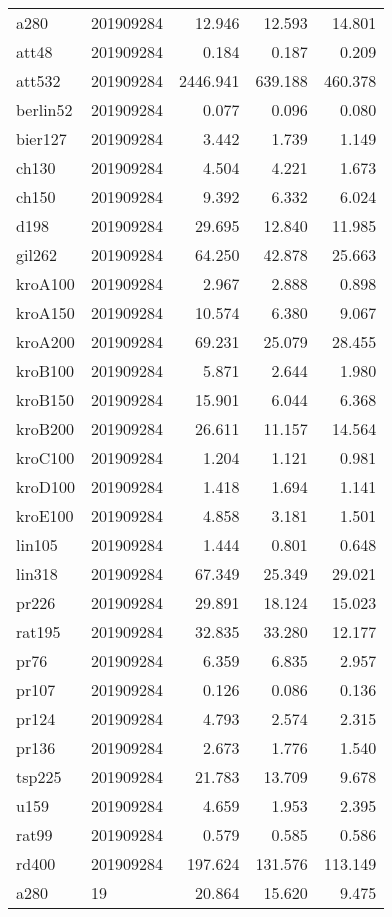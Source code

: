 \begin{center}
\begin{longtable}{llrrr}
a280 & 201909284 & 12.946 & 12.593 & 14.801\\
att48 & 201909284 & 0.184 & 0.187 & 0.209\\
att532 & 201909284 & 2446.941 & 639.188 & 460.378\\
berlin52 & 201909284 & 0.077 & 0.096 & 0.080\\
bier127 & 201909284 & 3.442 & 1.739 & 1.149\\
ch130 & 201909284 & 4.504 & 4.221 & 1.673\\
ch150 & 201909284 & 9.392 & 6.332 & 6.024\\
d198 & 201909284 & 29.695 & 12.840 & 11.985\\
gil262 & 201909284 & 64.250 & 42.878 & 25.663\\
kroA100 & 201909284 & 2.967 & 2.888 & 0.898\\
kroA150 & 201909284 & 10.574 & 6.380 & 9.067\\
kroA200 & 201909284 & 69.231 & 25.079 & 28.455\\
kroB100 & 201909284 & 5.871 & 2.644 & 1.980\\
kroB150 & 201909284 & 15.901 & 6.044 & 6.368\\
kroB200 & 201909284 & 26.611 & 11.157 & 14.564\\
kroC100 & 201909284 & 1.204 & 1.121 & 0.981\\
kroD100 & 201909284 & 1.418 & 1.694 & 1.141\\
kroE100 & 201909284 & 4.858 & 3.181 & 1.501\\
lin105 & 201909284 & 1.444 & 0.801 & 0.648\\
lin318 & 201909284 & 67.349 & 25.349 & 29.021\\
pr226 & 201909284 & 29.891 & 18.124 & 15.023\\
rat195 & 201909284 & 32.835 & 33.280 & 12.177\\
pr76 & 201909284 & 6.359 & 6.835 & 2.957\\
pr107 & 201909284 & 0.126 & 0.086 & 0.136\\
pr124 & 201909284 & 4.793 & 2.574 & 2.315\\
pr136 & 201909284 & 2.673 & 1.776 & 1.540\\
tsp225 & 201909284 & 21.783 & 13.709 & 9.678\\
u159 & 201909284 & 4.659 & 1.953 & 2.395\\
rat99 & 201909284 & 0.579 & 0.585 & 0.586\\
rd400 & 201909284 & 197.624 & 131.576 & 113.149\\
a280 & 19 & 20.864 & 15.620 & 9.475\\

\end{longtable}
\end{center}
